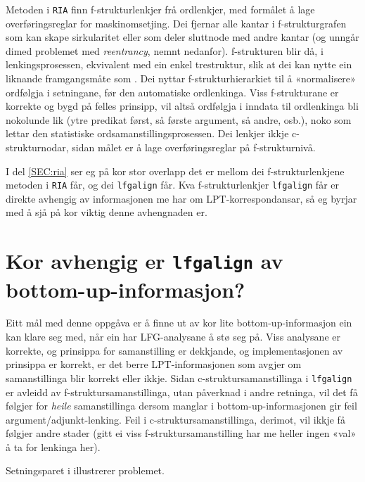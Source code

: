 \documentclass[12pt,a4paper,oneside,draft]{report}
\begin{document}
 Metoden i \texttt{RIA} \citep{graham2009osr,graham2009fts} finn
 f\hyp{}strukturlenkjer frå ordlenkjer, med formålet å lage
 overføringsreglar for maskinomsetjing. Dei fjernar alle kantar i
 f\hyp{}strukturgrafen som kan skape sirkularitet eller som deler sluttnode
 med andre kantar (og unngår dimed problemet med \emph{reentrancy}, nemnt
 nedanfor). f\hyp{}strukturen blir då, i lenkingsprosessen, ekvivalent med
 ein enkel trestruktur, slik at dei kan nytte ein liknande
 framgangsmåte som \citet{samuelsson2007apa}.  Dei nyttar
 f\hyp{}strukturhierarkiet til å «normalisere» ordfølgja i setningane, før
 den automatiske ordlenkinga. Viss f\hyp{}strukturane er korrekte og bygd
 på felles prinsipp, vil altså ordfølgja i inndata til ordlenkinga
 bli nokolunde lik (ytre predikat først, så første argument, så andre,
 osb.), noko som lettar den statistiske ordsamanstillingsprosessen.
 Dei lenkjer ikkje c\hyp{}strukturnodar, sidan målet er å lage
 overføringsreglar på f\hyp{}strukturnivå.

 I del \ref{SEC:ria} ser eg på kor stor overlapp det er mellom dei
 f\hyp{}strukturlenkjene metoden i \texttt{RIA} får, og dei \texttt{lfgalign} får. Kva
 f\hyp{}strukturlenkjer \texttt{lfgalign} får er direkte avhengig av informasjonen
 me har om LPT\hyp{}korrespondansar, så eg byrjar med å sjå på kor viktig
 denne avhengnaden er.

 
\section{Kor avhengig er \texttt{lfgalign} av bottom-up-informasjon?}
\label{sec-5.3}

 Eitt mål med denne oppgåva er å finne ut av kor lite
 bottom-up-informasjon ein kan klare seg med, når ein har
 LFG-analysane å stø seg på. Viss analysane er korrekte, og prinsippa
 for samanstilling er dekkjande, og implementasjonen av prinsippa er
 korrekt, er det berre LPT\hyp{}informasjonen som avgjer om samanstillinga
 blir korrekt eller ikkje. Sidan c\hyp{}struktursamanstillinga i \texttt{lfgalign}
 er avleidd av f\hyp{}struktursamanstillinga, utan påverknad i andre
 retninga, vil det få følgjer for \emph{heile} samanstillinga dersom
 manglar i bottom-up-informasjonen gir feil
 argument/adjunkt-lenking. Feil i c\hyp{}struktursamanstillinga, derimot,
 vil ikkje få følgjer andre stader (gitt ei viss
 f\hyp{}struktursamanstilling har me heller ingen «val» å ta for lenkinga
 her).

 Setningsparet i \Next illustrerer problemet.
\end{document}
